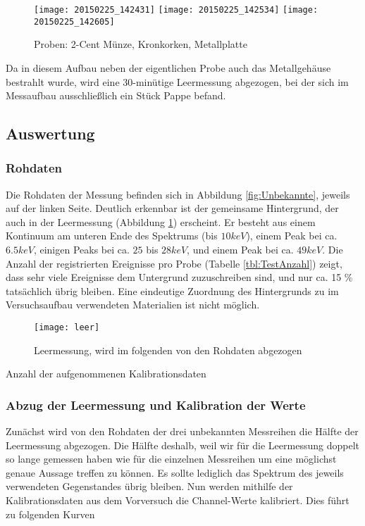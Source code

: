 \documentclass{../Misc/MontavonLaTeX/Montavon}
\newcommand{\thirdwidth}{0.32\textwidth}
\newcommand{\fullwidth}{1.0\textwidth}
\begin{document}
\begin{figure}
\centering
\texttt{[image: 20150225\_142431]}
\texttt{[image: 20150225\_142534]}
\texttt{[image: 20150225\_142605]}
\caption{Proben: 2-Cent Münze, Kronkorken, Metallplatte}
\end{figure}

Da in diesem Aufbau neben der eigentlichen Probe auch das Metallgehäuse bestrahlt wurde, wird eine 30-minütige Leermessung abgezogen, bei der sich im Messaufbau ausschließlich ein Stück Pappe befand.

\subsection{Auswertung}
\subsubsection{Rohdaten}
Die Rohdaten der Messung befinden sich in Abbildung \ref{fig:Unbekannte}, jeweils auf der linken Seite. Deutlich erkennbar ist der gemeinsame Hintergrund, der auch in der Leermessung (Abbildung \ref{fig:Leermessung}) erscheint. Er besteht aus einem Kontinuum am unteren Ende des Spektrums (bis $10 \unit{keV}$), einem Peak bei ca. $6.5 \unit{keV}$, einigen Peaks bei ca. $25$ bis $28 \unit{keV}$, und einem Peak bei ca. $49 \unit{keV}$. 
Die Anzahl der registrierten Ereignisse pro Probe (Tabelle \ref{tbl:TestAnzahl}) zeigt, dass sehr viele Ereignisse dem Untergrund zuzuschreiben sind, und nur ca. 15 \% tatsächlich übrig bleiben.
Eine eindeutige Zuordnung des Hintergrunds zu im Versuchsaufbau verwendeten Materialien ist nicht möglich.

\begin{figure}[h]
\centering
\texttt{[image: leer]}
\caption{Leermessung, wird im folgenden von den Rohdaten abgezogen}
\label{fig:Leermessung}
\end{figure}

\begin{table}[h]
\centering

\caption{Anzahl der aufgenommenen Kalibrationsdaten}
\label{tbl:TestAnzahl}
\end{table}

\subsubsection{Abzug der Leermessung und Kalibration der Werte}
Zunächst wird von den Rohdaten der drei unbekannten Messreihen die
Hälfte der Leermessung abgezogen. Die Hälfte deshalb, weil wir für
die Leermessung doppelt so lange gemessen haben wie für die einzelnen
Messreihen um eine möglichst genaue Aussage treffen zu können. Es
sollte lediglich das Spektrum des jeweils verwendeten Gegenstandes
übrig bleiben. Nun werden mithilfe der Kalibrationsdaten aus dem Vorversuch
die Channel-Werte kalibriert. Dies führt zu folgenden Kurven
\end{document}
